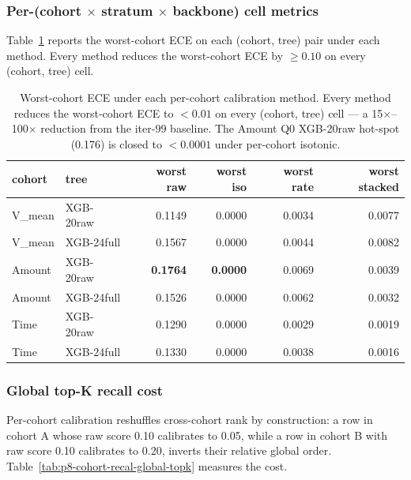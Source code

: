 \documentclass{article}
\begin{document}
\subsubsection{Per-(cohort $\times$ stratum $\times$ backbone) cell metrics}

Table~\ref{tab:p8-cohort-recal-worst-ece} reports the worst-cohort ECE on
each (cohort, tree) pair under each method. Every method reduces the
worst-cohort ECE by $\geq 0.10$ on every (cohort, tree) cell.

\begin{table}[h]
\centering
\small
\begin{tabular}{l l rrrr}
\toprule
cohort & tree & worst raw & worst iso & worst rate & worst stacked \\
\midrule
V\_mean  & XGB-20raw & 0.1149 & 0.0000 & 0.0034 & 0.0077 \\
V\_mean  & XGB-24full & 0.1567 & 0.0000 & 0.0044 & 0.0082 \\
Amount & XGB-20raw & \textbf{0.1764} & \textbf{0.0000} & 0.0069 & 0.0039 \\
Amount & XGB-24full & 0.1526 & 0.0000 & 0.0062 & 0.0032 \\
Time   & XGB-20raw & 0.1290 & 0.0000 & 0.0029 & 0.0019 \\
Time   & XGB-24full & 0.1330 & 0.0000 & 0.0038 & 0.0016 \\
\bottomrule
\end{tabular}
\caption{Worst-cohort ECE under each per-cohort calibration method. Every
method reduces the worst-cohort ECE to $< 0.01$ on every (cohort, tree) cell
--- a 15$\times$--100$\times$ reduction from the iter-99 baseline. The
Amount Q0 XGB-20raw hot-spot (0.176) is closed to $< 0.0001$ under
per-cohort isotonic.}
\label{tab:p8-cohort-recal-worst-ece}
\end{table}

\subsubsection{Global top-K recall cost}

Per-cohort calibration reshuffles cross-cohort rank by construction: a row
in cohort A whose raw score 0.10 calibrates to 0.05, while a row in cohort
B with raw score 0.10 calibrates to 0.20, inverts their relative global
order. Table~\ref{tab:p8-cohort-recal-global-topk} measures the cost.
\end{document}
